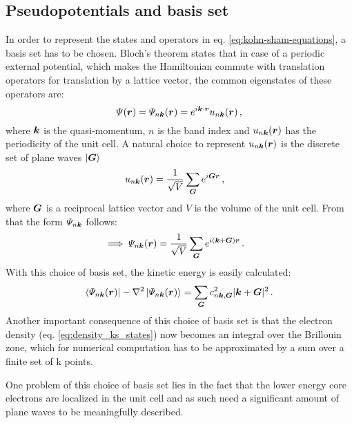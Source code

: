 \documentclass[main.tex]{subfiles}
\begin{document}
\subsection{Pseudopotentials and basis set}\label{sub:theory_basis_set}

In order to represent the states and operators in eq. \ref{eq:kohn-sham-equations}, a basis set has to be chosen.
Bloch's theorem states that in case of a periodic external potential, which makes the Hamiltonian commute with translation operators for translation by a lattice vector, the common eigenstates of these operators are:
\begin{equation}
    \Psi (\vb*{r}) = \Psi_{n \vb*{k}} (\vb*{r}) = e^{i \vb*{k} \cdot \vb*{r}} u_{n \vb*{k}} (\vb*{r})\,,
\end{equation}
where \(\vb*{k}\) is the quasi-momentum, \(n\) is the band index and \(u_{n \vb*{k}} (\vb*{r})\) has the periodicity of the unit cell.
A natural choice to represent \(u_{n \vb*{k}} (\vb*{r})\) is the discrete set of plane waves \(\ket{\vb*{G}}\)
\begin{align}
    u_{n \vb*{k}} (\vb*{r}) &= \frac{1}{\sqrt{V}} \sum_{\vb*{G}} e^{i \vb*{G} \vb*{r}}\,,
\end{align}
where \(\vb*{G}\) is a reciprocal lattice vector and \(V\) is the volume of the unit cell.
From that the form \(\Psi_{n \vb*{k}}\) follows:
\begin{align}\label{}
    \implies \Psi_{n \vb*{k}} (\vb*{r}) &= \frac{1}{\sqrt{V}} \sum_{\vb*{G}} e^{i (\vb*{k} + \vb*{G}) \vb*{r}}\,.
\end{align}
With this choice of basis set, the kinetic energy is easily calculated:
\begin{equation}
    \bra{\Psi_{n \vb*{k}} (\vb*{r})} - \nabla^2 \ket{\Psi_{n \vb*{k}} (\vb*{r})} = \sum_{\vb*{G}} c_{n \vb*{k}, \vb*{G}}^2 \vert \vb*{k} + \vb*{G} \vert^2\,.
\end{equation}
Another important consequence of this choice of basis set is that the electron density (eq. \ref{eq:density_ks_states}) now becomes an integral over the Brillouin zone, which for numerical computation has to be approximated by a sum over a finite set of k points. 

One problem of this choice of basis set lies in the fact that the lower energy core electrons are localized in the unit cell and as such need a significant amount of plane waves to be meaningfully described.

\end{document}
